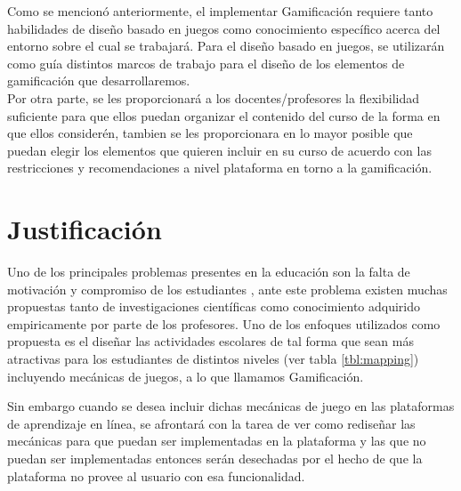 \noindent Como se mencionó anteriormente, el implementar Gamificación requiere tanto habilidades de diseño basado en juegos como conocimiento específico acerca del entorno sobre el cual se trabajará. Para el diseño basado en juegos, se utilizarán como guía distintos marcos de trabajo para el diseño de los elementos de gamificación que desarrollaremos.\\

\noindent Por otra parte, se les proporcionará a los docentes/profesores la flexibilidad suficiente para que ellos puedan organizar el contenido del curso de la forma en que ellos considerén, tambien se les proporcionara en lo mayor posible que puedan elegir los elementos que quieren incluir en su curso de acuerdo con las restricciones y recomendaciones a nivel plataforma en torno a la gamificación.
    
\clearpage


\section{Justificación}
\label{sec:justificacion}


Uno de los principales problemas presentes en la educación son la falta de motivación y compromiso de los estudiantes \cite{objetivo1}, ante este problema existen muchas propuestas tanto de investigaciones científicas como conocimiento adquirido empiricamente por parte de los profesores. Uno de los enfoques utilizados como propuesta es el diseñar las actividades escolares de tal forma que sean más atractivas para los estudiantes de distintos niveles (ver tabla \ref{tbl:mapping}) incluyendo mecánicas de juegos, a lo que llamamos Gamificación.


\noindent Sin embargo cuando se desea incluir dichas mecánicas de juego en las plataformas de aprendizaje en línea, se afrontará con la tarea de ver como rediseñar las mecánicas para que puedan ser implementadas en la plataforma y las que no puedan ser implementadas entonces serán desechadas por el hecho de que la plataforma no provee al usuario con esa funcionalidad. 

